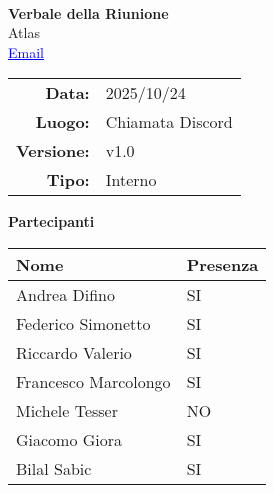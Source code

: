 \documentclass[a4paper,12pt]{article}
\makeatletter
\newcommand{\Gruppo}{Atlas}
\newcommand{\Email}{\href{mailto:team9.atlas@gmail.com}{\textcolor{blue}{\underline{Email}}}}
\newcommand{\TitoloVerbale}{Verbale della Riunione}
\newcommand{\DataVerbale}{2025/10/24}
\newcommand{\LuogoVerbale}{Chiamata Discord}
\newcommand{\LogoGruppo}{img/AtlasLogo.png} %
\newcommand{\VersioneVerbale}{v1.0} %
\newcommand{\VerbaleInterno}{Interno}
\makeatother
\begin{document}
\begin{titlepage}
    \centering

    \vspace*{0cm}
    \\
    [.5cm]
    {\Huge \textbf{\TitoloVerbale}}\\[0.8cm]
    {\LARGE \Gruppo}\\[0.1cm]
    {\Email}\\[1.2cm]

    \begin{tabular}{rl}
        \textbf{Data:} & \DataVerbale \\
        \textbf{Luogo:} & \LuogoVerbale \\
        \textbf{Versione:} & \VersioneVerbale \\
        \textbf{Tipo:} & \VerbaleInterno \\
    \end{tabular}

    \vspace{1.2cm}

    {\large \textbf{Partecipanti}}\\[0.5cm]
    \begin{tabular}{l|l}
        \textbf{Nome} & \textbf{Presenza} \\
        \hline
        Andrea Difino & SI \\
        Federico Simonetto & SI \\
        Riccardo Valerio & SI \\
        Francesco Marcolongo & SI \\
        Michele Tesser & NO \\
        Giacomo Giora & SI \\
        Bilal Sabic & SI \\
    \end{tabular}

\end{titlepage}
\end{document}
